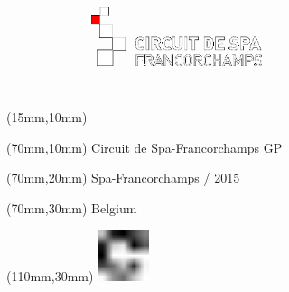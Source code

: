 \null\newpage
\begin{textblock*}{50mm}(15mm,10mm)%
\includegraphics[width=50mm]{LG/SPA.png}
\end{textblock*}
\begin{textblock*}{130mm}(70mm,10mm)%
{\fontsize{20}{20}\selectfont Circuit de Spa-Francorchamps GP}\\
\end{textblock*}
\begin{textblock*}{120mm}(70mm,20mm)%
{\fontsize{16}{16}\selectfont Spa-Francorchamps / 2015}\\
\end{textblock*}
\begin{textblock*}{120mm}(70mm,30mm)%
{\fontsize{12}{12}\selectfont Belgium}
\end{textblock*}
\begin{textblock*}{30mm}(110mm,30mm)%
\centering
\includegraphics[height=15mm]{icons/fa-rotate-right.pdf}
\end{textblock*}
